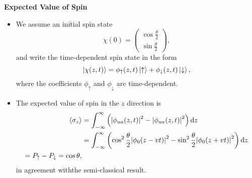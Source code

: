 \documentclass[11pt, a4paper]{article}
\newcommand{\diff}{\mathop{}\!\mathrm{d}} %
\newcommand{\ua}{\uparrow}  %
\newcommand{\da}{\downarrow}  %
\begin{document}
\textbf{Expected Value of Spin}
\begin{itemize}
    \item We assume an initial spin state
    \begin{equation*}
        \chi(0) = 
        \begin{pmatrix}
            \cos \frac{\theta}{2}\\[1mm]
            \sin \frac{\theta}{2}
        \end{pmatrix},
    \end{equation*}
    and write the time-dependent spin state in the form
    \begin{equation*}
        \ket{\chi(z, t)} = \phi_{\ua}(z, t) \ket{\ua} + \phi_{\da}(z, t)\ket{\da},
    \end{equation*}
    where the coefficients $ \phi_{\ua} $ and $ \phi_{\da} $ are time-dependent.

    \item The expected value of spin in the $ z $ direction is
    \begin{align*}
        \ev{\sigma_{z}} &= \int_{-\infty}^{\infty}\left( \abs{\phi_{ua}(z, t)}^{2} - \abs{\phi_{ua}(z, t)}^{2} \right)\diff z\\
        & = \int_{-\infty}^{\infty} \left( \cos^{2} \frac{\theta}{2} \abs{\phi_{0}(z - vt)}^{2} - \sin^{2}\frac{\theta}{2} \abs{\phi_{0}(z + vt)}^{2} \right)\diff z\\
        = P_{\ua} - P_{\da} = \cos \theta,
    \end{align*}
    in agreement withthe semi-classical result.
    

\end{itemize}
\end{document}
